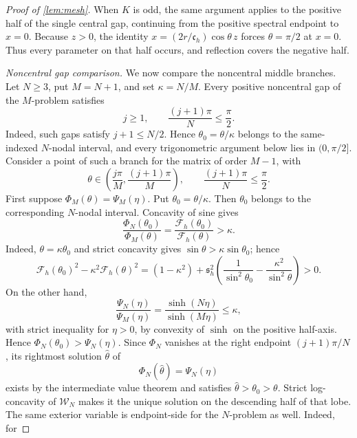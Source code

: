 \documentclass[review,hidelinks,onefignum,onetabnum]{siamart251216}
\begin{document}
\begin{proof}[Proof of \cref{lem:mesh}]
When \(K\) is odd, the same argument applies to the positive half of
the single central gap, continuing from the positive spectral endpoint
to \(x=0\).  Because \(z>0\), the identity
\(x=(2r/\mathfrak c_h)\cos\theta\,z\) forces \(\theta=\pi/2\) at
\(x=0\).
Thus every parameter on that half occurs, and reflection covers the
negative half.

\medskip\noindent\emph{Noncentral gap comparison.}\quad
We now compare the noncentral middle branches.  Let \(N\geq3\), put
\(M=N+1\), and set \(\kappa=N/M\).  Every positive noncentral gap of
the \(M\)-problem
satisfies
\begin{equation}\label{eq:noncentral-domain}
 j\geq1,\qquad \frac{(j+1)\pi}{N}\leq\frac{\pi}{2}.
\end{equation}
Indeed, such gaps satisfy \(j+1\leq N/2\).  Hence
\(\theta_0=\theta/\kappa\) belongs to the
same-indexed \(N\)-nodal interval, and every trigonometric argument
below lies in \((0,\pi/2]\).  Consider a point of such a branch for the
matrix of order \(M-1\), with
\[
 \theta\in\left(\frac{j\pi}{M},\frac{(j+1)\pi}{M}\right),
 \qquad \frac{(j+1)\pi}{N}\leq\frac{\pi}{2}.
\]
First suppose \(\Phi_M(\theta)=\Psi_M(\eta)\).  Put
\(\theta_0=\theta/\kappa\).  Then \(\theta_0\) belongs to the
corresponding \(N\)-nodal interval.  Concavity of sine gives
\begin{equation}\label{eq:Phi-scale}
 \frac{\Phi_N(\theta_0)}{\Phi_M(\theta)}
 =\frac{\mathcal F_h(\theta_0)}{\mathcal F_h(\theta)}>\kappa.
\end{equation}
Indeed, \(\theta=\kappa\theta_0\) and strict concavity gives
\(\sin\theta>\kappa\sin\theta_0\); hence
\[
 \mathcal F_h(\theta_0)^2-\kappa^2\mathcal F_h(\theta)^2
 =(1-\kappa^2)+\mathfrak s_h^2\left(
 \frac1{\sin^2\theta_0}-\frac{\kappa^2}{\sin^2\theta}
 \right)>0.
\]
On the other hand,
\begin{equation}\label{eq:Psi-scale}
 \frac{\Psi_N(\eta)}{\Psi_M(\eta)}
 =\frac{\sinh(N\eta)}{\sinh(M\eta)}\leq\kappa,
\end{equation}
with strict inequality for \(\eta>0\), by convexity of \(\sinh\) on
the positive half-axis.  Hence
\(\Phi_N(\theta_0)>\Psi_N(\eta)\).  Since \(\Phi_N\) vanishes at the right
endpoint \((j+1)\pi/N\), its rightmost solution
\(\widehat\theta\) of
\[
 \Phi_N(\widehat\theta)=\Psi_N(\eta)
\]
exists by the intermediate value theorem and satisfies
\(\widehat\theta>\theta_0>\theta\).  Strict log-concavity of
\(\mathcal W_N\) makes it the unique solution on the descending half
of that lobe.  The same exterior
variable is endpoint-side for the \(N\)-problem as well.  Indeed, for

\end{proof}
\end{document}
